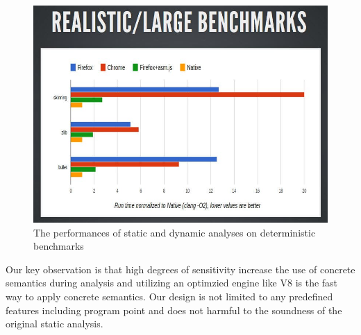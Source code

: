 \begin{figure}
  \centering
  \includegraphics[width=\linewidth]{benchmark_performance}
  \caption{The performances of static and dynamic analyses on deterministic benchmarks}
  \label{fig:performance}
\end{figure}

Our key observation is that high degrees of sensitivity increase the use of
concrete semantics during analysis and utilizing an optimzied engine like V8 is
the fast way to apply concrete semantics.
Our design is not limited to any predefined features including program point and
does not harmful to the soundness of the original static analysis.




